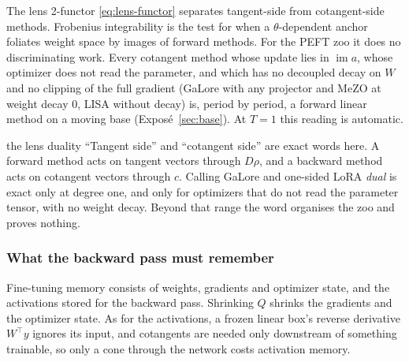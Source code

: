 \begin{explains}
The lens 2-functor \eqref{eq:lens-functor} separates tangent-side from cotangent-side methods. Frobenius integrability
is the test for when a $\theta$-dependent anchor foliates weight space by images of forward methods. For the PEFT zoo it
does no discriminating work. Every cotangent method whose update lies in $\operatorname{im}a$, whose optimizer does not
read the parameter, and which has no decoupled decay on $W$ and no clipping of the full gradient (GaLore with any
projector and MeZO at weight decay $0$, LISA without decay) is, period by period, a forward linear method on a moving
base (Exposé~\ref{sec:base}). At $T=1$ this reading is automatic.
\end{explains}

\begin{analogy*}{the lens duality}
``Tangent side'' and ``cotangent side'' are exact words here. A forward method acts on tangent vectors through
$D\rho$, and a backward method acts on cotangent vectors through $c$. Calling GaLore and one-sided LoRA \emph{dual} is
exact only at degree one, and only for optimizers that do not read the parameter tensor, with no weight decay. Beyond
that range the word organises the zoo and proves nothing.
\end{analogy*}

\subsubsection{What the backward pass must remember}\label{sec:lens-cone}

Fine-tuning memory consists of weights, gradients and optimizer state, and the activations stored for the backward
pass. Shrinking $Q$ shrinks the gradients and the optimizer state. As for the activations, a frozen linear box's reverse
derivative $W^\top y$ ignores its input, and cotangents are needed only downstream of something trainable, so only a
cone through the network costs activation memory.

